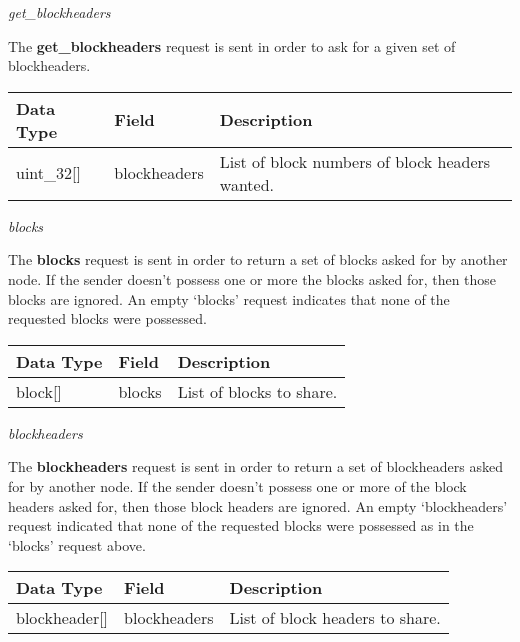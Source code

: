 \documentclass{article}
\begin{document}
\begin{center}
    \large \textit{get\_blockheaders}
\end{center}
The \textbf{get\_blockheaders} request is sent in order to ask for a given set of blockheaders.
\begin{table}[H]
\centering
\begin{tabular}{|p{1.5cm}|p{2.5cm}|p{5.5cm}|}
\hline
\rowcolor{tblgrey}
Data Type   & Field       & Description\\ \hline
uint\_32[\hspace{0.05cm}] & blockheaders & List of block numbers of block headers wanted.                    \\ \hline
\end{tabular}
\end{table}

\begin{center}
    \large \textit{blocks}
\end{center}
The \textbf{blocks} request is sent in order to return a set of blocks asked for by another node. If the sender doesn't possess one or more the blocks asked for, then those blocks are ignored. An empty `blocks' request indicates that none of the requested blocks were possessed.
\begin{table}[H]
\centering
\begin{tabular}{|p{1.5cm}|p{2.5cm}|p{5.5cm}|}
\hline
\rowcolor{tblgrey}
Data Type   & Field       & Description\\ \hline
block[\hspace{0.05cm}] & blocks & List of blocks to share.                    \\ \hline
\end{tabular}
\end{table}

\begin{center}
    \large \textit{blockheaders}
\end{center}
The \textbf{blockheaders} request is sent in order to return a set of blockheaders asked for by another node. If the sender doesn't possess one or more of the block headers asked for, then those block headers are ignored. An empty `blockheaders' request indicated that none of the requested blocks were possessed as in the `blocks' request above.
\begin{table}[H]
\centering
\begin{tabular}{|p{2.2cm}|p{2.5cm}|p{5.5cm}|}
\hline
\rowcolor{tblgrey}
Data Type   & Field       & Description\\ \hline
blockheader[\hspace{0.05cm}] & blockheaders & List of block headers to share.                    \\ \hline
\end{tabular}
\end{table}
\end{document}
